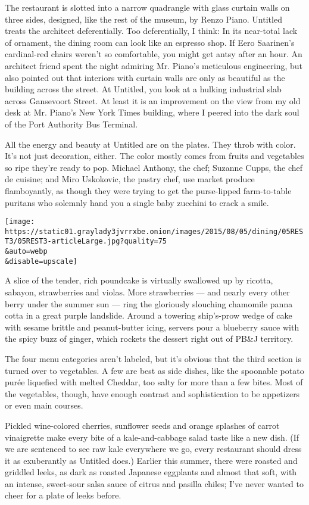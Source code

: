 The restaurant is slotted into a narrow quadrangle with glass curtain
walls on three sides, designed, like the rest of the museum, by Renzo
Piano. Untitled treats the architect deferentially. Too deferentially, I
think: In its near-total lack of ornament, the dining room can look like
an espresso shop. If Eero Saarinen's cardinal-red chairs weren't so
comfortable, you might get antsy after an hour. An architect friend
spent the night admiring Mr. Piano's meticulous engineering, but also
pointed out that interiors with curtain walls are only as beautiful as
the building across the street. At Untitled, you look at a hulking
industrial slab across Gansevoort Street. At least it is an improvement
on the view from my old desk at Mr. Piano's New York Times building,
where I peered into the dark soul of the Port Authority Bus Terminal.

All the energy and beauty at Untitled are on the plates. They throb with
color. It's not just decoration, either. The color mostly comes from
fruits and vegetables so ripe they're ready to pop. Michael Anthony, the
chef; Suzanne Cupps, the chef de cuisine; and Miro Uskokovic, the pastry
chef, use market produce flamboyantly, as though they were trying to get
the purse-lipped farm-to-table puritans who solemnly hand you a single
baby zucchini to crack a smile.

\texttt{[image: https://static01.graylady3jvrrxbe.onion/images/2015/08/05/dining/05REST3/05REST3-articleLarge.jpg?quality=75\\\&auto=webp\\\&disable=upscale]}

A slice of the tender, rich poundcake is virtually swallowed up by
ricotta, sabayon, strawberries and violas. More strawberries --- and
nearly every other berry under the summer sun --- ring the gloriously
slouching chamomile panna cotta in a great purple landslide. Around a
towering ship's-prow wedge of cake with sesame brittle and peanut-butter
icing, servers pour a blueberry sauce with the spicy buzz of ginger,
which rockets the dessert right out of PB\&J territory.

The four menu categories aren't labeled, but it's obvious that the third
section is turned over to vegetables. A few are best as side dishes,
like the spoonable potato purée liquefied with melted Cheddar, too salty
for more than a few bites. Most of the vegetables, though, have enough
contrast and sophistication to be appetizers or even main courses.

Pickled wine-colored cherries, sunflower seeds and orange splashes of
carrot vinaigrette make every bite of a kale-and-cabbage salad taste
like a new dish. (If we are sentenced to see raw kale everywhere we go,
every restaurant should dress it as exuberantly as Untitled does.)
Earlier this summer, there were roasted and griddled leeks, as dark as
roasted Japanese eggplants and almost that soft, with an intense,
sweet-sour salsa sauce of citrus and pasilla chiles; I've never wanted
to cheer for a plate of leeks before.

